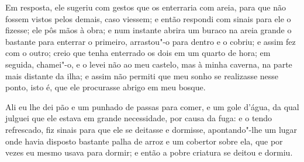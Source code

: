 Em resposta, ele sugeriu com gestos que os enterraria com areia, para
que não fossem vistos pelos demais, caso viessem; e então respondi com
sinais para ele o fizesse; ele pôs mãos à obra; e num instante abrira um
buraco na areia grande o bastante para enterrar o primeiro, arrastou"-o
para dentro e o cobriu; e assim fez com o outro; creio que tenha
enterrado os dois em um quarto de hora; em seguida, chamei"-o, e o levei
não ao meu castelo, mas à minha caverna, na parte mais distante da ilha;
e assim não permiti que meu sonho se realizasse nesse ponto, isto é, que
ele procurasse abrigo em meu bosque.

Ali eu lhe dei pão e um punhado de passas para comer, e um gole d'água,
da qual julguei que ele estava em grande necessidade, por causa da fuga:
e o tendo refrescado, fiz sinais para que ele se deitasse e dormisse,
apontando"-lhe um lugar onde havia disposto bastante palha de arroz e um
cobertor sobre ela, que por vezes eu mesmo usava para dormir; e então a
pobre criatura se deitou e dormiu.


